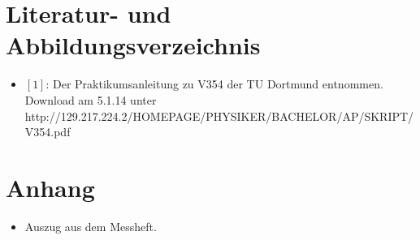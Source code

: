 \documentclass[11pt,ngerman,a4paper]{article}
\begin{document}
\section{Literatur- und Abbildungsverzeichnis}
\begin{itemize}
\item $[1]$: Der Praktikumsanleitung zu V354 der TU Dortmund entnommen. Download am 5.1.14 unter \newline http://129.217.224.2/HOMEPAGE/PHYSIKER/BACHELOR/AP/SKRIPT/V354.pdf
\end{itemize}
\section{Anhang}
\begin{itemize}
\item Auszug aus dem Messheft.
\end{itemize}
\end{document}
